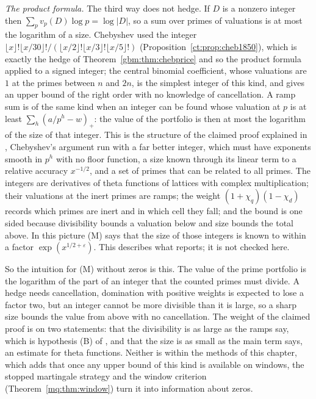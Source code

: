 \emph{The product formula.} The third way does not hedge. If $D$ is a nonzero integer then $\sum_pv_p(D)\log p=\log|D|$, so a sum over primes of valuations is at most the logarithm of a size. Chebyshev used the integer $\lfloor x\rfloor!\lfloor x/30\rfloor!/(\lfloor x/2\rfloor!\lfloor x/3\rfloor!\lfloor x/5\rfloor!)$ (Proposition~\ref{ct:prop:cheb1850}), which is exactly the hedge of Theorem~\ref{gbm:thm:chebprice} and so the product formula applied to a signed integer; the central binomial coefficient, whose valuations are $1$ at the primes between $n$ and $2n$, is the simplest integer of this kind, and gives an upper bound of the right order with no knowledge of cancellation. A ramp sum is of the same kind when an integer can be found whose valuation at $p$ is at least $\sum_h(a/p^h-w)_+$: the value of the portfolio is then at most the logarithm of the size of that integer. This is the structure of the claimed proof explained in \cite{Rub26}, Chebyshev's argument run with a far better integer, which must have exponents smooth in $p^h$ with no floor function, a size known through its linear term to a relative accuracy $x^{-1/2}$, and a set of primes that can be related to all primes. The integers are derivatives of theta functions of lattices with complex multiplication; their valuations at the inert primes are ramps; the weight $(1+\chi_q)(1-\chi_d)$ records which primes are inert and in which cell they fall; and the bound is one sided because divisibility bounds a valuation below and size bounds the total above. In this picture (M) says that the size of those integers is known to within a factor $\exp(x^{1/2+\varepsilon})$. This describes what \cite{Rub26} reports; it is not checked here.

So the intuition for (M) without zeros is this. The value of the prime portfolio is the logarithm of the part of an integer that the counted primes must divide. A hedge needs cancellation, domination with positive weights is expected to lose a factor two, but an integer cannot be more divisible than it is large, so a sharp size bounds the value from above with no cancellation. The weight of the claimed proof is on two statements: that the divisibility is as large as the ramps say, which is hypothesis (B) of \cite{Rub26}, and that the size is as small as the main term says, an estimate for theta functions. Neither is within the methods of this chapter, which adds that once any upper bound of this kind is available on windows, the stopped martingale strategy and the window criterion (Theorem~\ref{mq:thm:window}) turn it into information about zeros.

